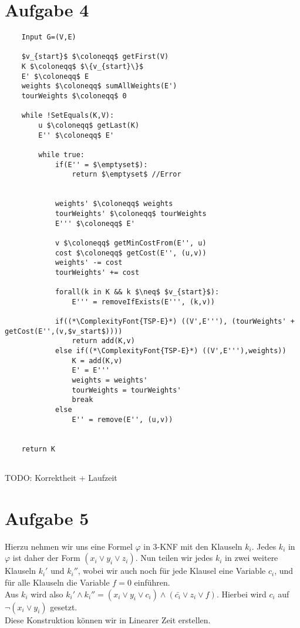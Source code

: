 \documentclass[a4paper,11pt]{scrartcl}
\renewcommand{\phi}{\varphi}
\begin{document}
	\section*{Aufgabe 4}
	\begin{lstlisting}
	Input G=(V,E)	
	
	$v_{start}$ $\coloneqq$ getFirst(V)
	K $\coloneqq$ $\{v_{start}\}$
	E' $\coloneqq$ E
	weights $\coloneqq$ sumAllWeights(E')
	tourWeights $\coloneqq$ 0
	
	while !SetEquals(K,V):
		u $\coloneqq$ getLast(K)
		E'' $\coloneqq$ E'
		
		while true:
			if(E'' = $\emptyset$):
				return $\emptyset$ //Error
			
			
			weights' $\coloneqq$ weights
			tourWeights' $\coloneqq$ tourWeights
			E''' $\coloneqq$ E'
			
			v $\coloneqq$ getMinCostFrom(E'', u)
			cost $\coloneqq$ getCost(E'', (u,v))
			weights' -= cost
			tourWeights' += cost
			
			forall(k in K && k $\neq$ $v_{start}$):
				E''' = removeIfExists(E''', (k,v))
			
			if((*\ComplexityFont{TSP-E}*) ((V',E'''), (tourWeights' + getCost(E'',(v,$v_start$))))
				return add(K,v)
			else if((*\ComplexityFont{TSP-E}*) ((V',E'''),weights))
				K = add(K,v)
				E' = E'''
				weights = weights'
				tourWeights = tourWeights'
				break
			else
				E'' = remove(E'', (u,v))
	
	
	return K
			
	\end{lstlisting}
	
TODO: Korrektheit + Laufzeit	
	
	\section*{Aufgabe 5}
	Hierzu nehmen wir uns eine Formel $\phi$ in 3-KNF mit den Klauseln $k_i$.
	Jedes $k_i$ in $\phi$ ist daher der Form $(x_i \lor y_i \lor z_i)$. Nun teilen wir jedes $k_i$ in zwei weitere Klauseln $k_i'$ und $k_i''$, wobei wir auch noch für jede Klausel eine Variable $c_i$, und für alle Klauseln die Variable $f = 0$ einführen.\\
	Aus $k_i$ wird also $k_i' \land k_i'' = (x_i \lor y_i \lor c_i) \land (\bar{c_i} \lor z_i \lor f)$.
	Hierbei wird $c_i$ auf $\neg (x_i \lor y_i)$ gesetzt.\\
	Diese Konstruktion können wir in Linearer Zeit erstellen.\\
	
\end{document}
